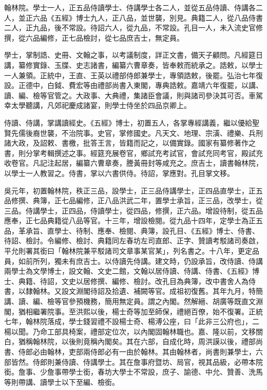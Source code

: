 翰林院。學士一人，正五品侍讀學士、侍講學士各二人，並從五品侍讀、侍講各二人，並正六品《五經》博士九人，正八品，並世襲，別見。典籍二人，從八品侍書二人，正九品，後不常設。待詔六人，從九品，不常設。孔目一人，未入流史官修撰，從六品編修，正七品檢討，從七品庶吉士，無定員。

學士，掌制誥、史冊、文翰之事，以考議制度，詳正文書，備天子顧問。凡經筵日講，纂修實錄、玉牒、史志諸書，編纂六曹章奏，皆奉敕而統承之。誥敕，以學士一人兼領。正統中，王直、王英以禮部侍郎兼學士，專領誥敕，後罷。弘治七年復設。正德中，白鉞、費宏等由禮部尚書入東閣，專典誥敕。嘉靖六年復罷，以講、讀、編、檢等官管之。大政事、大典禮，集諸臣會議，則與諸司參決其可否。車駕幸太學聽講，凡郊祀慶成諸宴，則學士侍坐於四品京卿上。

侍讀、侍講，掌講讀經史。《五經》博士，初置五人，各掌專經講義，繼以優給聖賢先儒後裔世襲，不治院事。史官，掌修國史。凡天文、地理、宗潢、禮樂、兵刑諸大政，及詔敕、書檄，批答王言，皆籍而記之，以備實錄。國家有纂修著作之書，則分掌考輯撰述之事。經筵充展卷官，鄉試充考試官，會試充同考官，殿試充收卷官。凡記注起居，編纂六曹章奏，謄黃冊封等咸充之。庶吉士，讀書翰林院，以學士一人教習之。侍書，掌以六書供侍。待詔，掌應對。孔目掌文移。

吳元年，初置翰林院，秩正三品，設學士，正三品侍講學士，正四品直學士，正五品修撰、典簿，正七品編修，正八品洪武二年，置學士承旨，正三品，改學士，從三品。侍講學士，正四品，侍讀學士，從四品，修撰，正六品。增設待制，從五品應奉，正七品典籍從八品等官。十三年，增設檢閱。從九品十四年，定學士為正五品，革承旨、直學士、待制、應奉、檢閱、典簿，設孔目、《五經》博士、侍書、待詔、檢討。令編修、檢討、典籍同左春坊左司直郎、正字、贊讀考駁諸司奏啟，平允則署其銜曰「翰林院兼平駁諸司文章事某官某」，列名書之。十八年，更定品員，如前所列，獨未有庶吉士。以侍讀先侍講。建文時，仍設承旨，改侍讀、侍講兩學士為文學博士，設文翰、文史二館，文翰以居侍讀、侍講、侍書、《五經》博士、典籍、待詔，文史以居修撰、編修、檢討。改孔目為典簿，改中書舍人為侍書，以隸翰林。又設文淵閣待詔及拾遺、補闕等官。成祖初復舊。其年九月，特簡講、讀、編、檢等官參預機務，簡用無定員。謂之內閣。然解縉、胡廣等既直文淵閣，猶相繼署院事。至洪熙以後，楊士奇等加至師保，禮絕百僚，始不復署。正統七年，翰林院落成，學士錢習禮不設楊士奇、楊溥公座，曰「此非三公府也」，二楊以聞。乃命工部具椅案，禮部定位次，以內閣固翰林職也。嘉、隆以前，文移關白，猶稱翰林院，以後則竟稱內閣矣。其在六部，自成化時，周洪謨以後，禮部尚書、侍郎必由翰林，吏部兩侍郎必有一由於翰林。其由翰林者，尚書則兼學士，六部皆然。侍郎則兼侍讀、侍講學士。其在詹事府暨坊、局官，視其品級，必帶本院銜。詹事、少詹事帶學士銜，春坊大學士不常設，庶子、諭德、中允、贊善、洗馬等則帶講、讀學士以下至編、檢銜。

